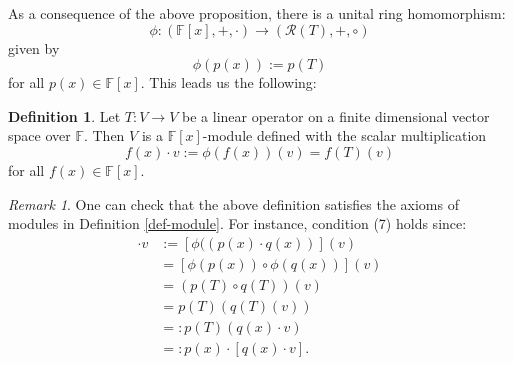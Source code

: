 \documentclass[11pt,openany]{book}
\theoremstyle{plain}
\theoremstyle{definition}
\newtheorem{definition}[definition]{Definition}
\theoremstyle{remark}
\newtheorem{remark}[remark]{Remark}
\begin{document}
As a consequence of the above proposition, there is a unital ring homomorphism:
$$\phi: (\mathbb{F}[x], +, \cdot) \longrightarrow (\mathcal{R}(T), +, \circ)$$
given by $$\phi(p(x)) := p(T)$$ for all $p(x) \in \mathbb{F}[x]$. This leads us the following:

\begin{definition} \label{def-fx}
    Let $T:V\to V$ be a linear operator on a finite dimensional vector space over $\mathbb{F}$. Then $V$ is a $\mathbb{F}[x]$-module defined with the scalar multiplication 
    $$f(x)\cdot v:= \phi(f(x))(v) = f(T)(v)$$
    for all $f(x) \in \mathbb{F}[x]$.
\end{definition}
\begin{remark}
    One can check that the above definition satisfies the axioms of modules in Definition \ref{def-module}. For instance, condition (7) holds since:
    \begin{align*}
    [p(x) \cdot q(x)]\cdot v &:= [\phi((p(x)\cdot q(x))](v) \\
    &= [\phi(p(x)) \circ \phi(q(x))](v) \\
    &= (p(T) \circ q(T))(v) \\
    &= p(T)(q(T)(v)) \\
    &=: p(T)\left(q(x)\cdot v\right) \\
    &=: p(x) \cdot [q(x) \cdot v].    
    \end{align*}  
\end{remark}
\end{document}
